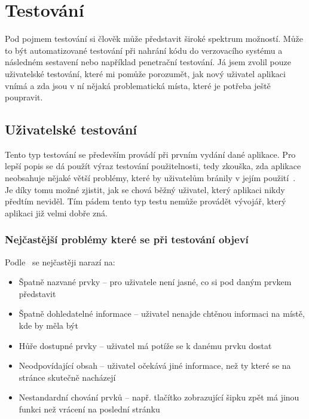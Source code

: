 
\chapter{Testování}

Pod pojmem testování si člověk může představit široké spektrum možností. Může to být automatizované testování při nahrání kódu
do verzovacího systému a následném sestavení nebo například penetrační testování. Já jsem zvolil pouze uživatelské testování,
které mi pomůže porozumět, jak nový uživatel aplikaci vnímá a zda jsou v ní nějaká problematická místa, které je potřeba ještě
poupravit.

\section{Uživatelské testování}
Tento typ testování se především provádí při prvním vydání dané aplikace. Pro lepší popis se dá použít výraz testování použitelnosti,
tedy zkouška, zda aplikace neobsahuje nějaké větší problémy, které by uživatelům bránily v jejím použití~\cite{UserTesting}. Je díky tomu možné
zjistit, jak se chová běžný uživatel, který aplikaci nikdy předtím neviděl. Tím pádem tento typ testu nemůže provádět vývojář,
který aplikaci již velmi dobře zná.

\subsection{Nejčastější problémy které se při testování objeví}

Podle~\cite{UserTesting} se nejčastěji narazí na:

\begin{itemize}
    \item Špatně nazvané prvky -- pro uživatele není jasné, co si pod daným prvkem představit
    \item Špatně dohledatelné informace -- uživatel nenajde chtěnou informaci na místě, kde by měla být
    \item Hůře dostupné prvky -- uživatel má potíže se k danému prvku dostat
    \item Neodpovídající obsah -- uživatel očekává jiné informace, než ty které se na stránce skutečně nacházejí
    \item Nestandardní chování prvků -- např. tlačítko zobrazující šipku zpět má jinou funkci než vrácení na poslední stránku
\end{itemize}

